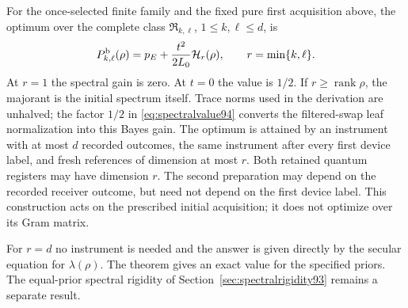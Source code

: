 \begin{theorem}\label{thm:spectralvalue94}
For the once-selected finite family and the fixed pure first acquisition
above, the optimum over the complete class $\mathfrak R_{k,\ell}$,
$1\le k,\ell\le d$, is
\begin{equation}\label{eq:spectralvalue94}
 P_{k,\ell}^{\rm b}(\rho)
       =p_E+\frac{t^2}{2L_0}\mathcal H_r(\rho),
                 \qquad r=\min\{k,\ell\}.
\end{equation}
At $r=1$ the spectral gain is zero.  At $t=0$ the value is $1/2$.
If $r\ge\operatorname{rank}\rho$, the majorant is the initial spectrum
itself.  Trace norms used in the derivation are unhalved; the factor
$1/2$ in \eqref{eq:spectralvalue94} converts the filtered-swap leaf
normalization into this Bayes gain.
The optimum is attained by an instrument with at most $d$ recorded
outcomes, the same instrument after every first device label, and fresh
references of dimension at most $r$.  Both retained quantum registers
may have dimension $r$.  The second preparation may depend on the
recorded receiver outcome, but need not depend on the first device
label.  This construction acts on the prescribed initial acquisition;
it does not optimize over its Gram matrix.
\end{theorem}
For $r=d$ no instrument is needed and the answer is given directly by
the secular equation for $\lambda(\rho)$.  The theorem gives an exact
value for the specified priors.  The equal-prior spectral rigidity of
Section~\ref{sec:spectralrigidity93} remains a separate result.

